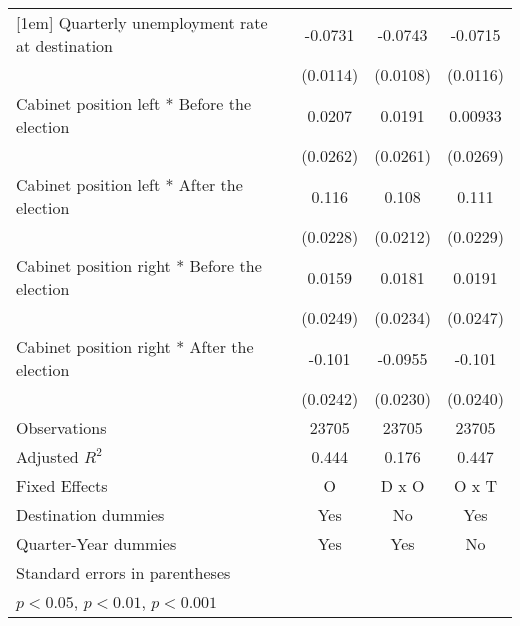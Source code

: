 \begin{table}[htbp]
\begin{tabular}{l*{3}{c}}
[1em]
Quarterly unemployment rate at destination&     -0.0731\sym{***}&     -0.0743\sym{***}&     -0.0715\sym{***}\\
                    &    (0.0114)         &    (0.0108)         &    (0.0116)         \\
[1em]
Cabinet position left * Before the election&      0.0207         &      0.0191         &     0.00933         \\
                    &    (0.0262)         &    (0.0261)         &    (0.0269)         \\
[1em]
Cabinet position left * After the election&       0.116\sym{***}&       0.108\sym{***}&       0.111\sym{***}\\
                    &    (0.0228)         &    (0.0212)         &    (0.0229)         \\
[1em]
Cabinet position right * Before the election&      0.0159         &      0.0181         &      0.0191         \\
                    &    (0.0249)         &    (0.0234)         &    (0.0247)         \\
[1em]
Cabinet position right * After the election&      -0.101\sym{***}&     -0.0955\sym{***}&      -0.101\sym{***}\\
                    &    (0.0242)         &    (0.0230)         &    (0.0240)         \\
\hline
Observations        &       23705         &       23705         &       23705         \\
Adjusted \(R^{2}\)  &       0.444         &       0.176         &       0.447         \\
Fixed Effects       &           O         &       D x O         &       O x T         \\
Destination dummies &         Yes         &          No         &         Yes         \\
Quarter-Year dummies&         Yes         &         Yes         &          No         \\
\hline\hline
\multicolumn{4}{l}{\footnotesize Standard errors in parentheses}\\
\multicolumn{4}{l}{\footnotesize \sym{*} \(p<0.05\), \sym{**} \(p<0.01\), \sym{***} \(p<0.001\)}\\
\end{tabular}
\end{table}
